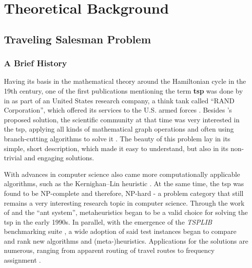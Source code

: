 
\chapter{Theoretical Background} %
\label{chap:background}
\glsresetall

\section{Traveling Salesman Problem}
\label{chap:tsp}

\subsection{A Brief History}

Having its basis in the mathematical theory around the Hamiltonian cycle in the 19th century, one of the first publications mentioning the term \textbf{\gls{tsp}} was done by  in \citeyear{robinson1949hamiltonian} as part of an United States research company, a think tank called \enquote{RAND Corporation}, which offered its services to the U.S. armed forces \cite{schrijver2005history}. Besides \citeauthor{robinson1949hamiltonian}'s proposed solution, the scientific community at that time was very interested in the \gls{tsp}, applying all kinds of mathematical graph operations and often using branch-cutting algorithms to solve it \cite{lawler1985traveling}. The beauty of this problem lay in its simple, short description, which made it easy to understand, but also in its non-trivial and engaging solutions.

With advances in computer science also came more computationally applicable algorithms, such as the Kernighan–Lin heuristic \cite{lin1973effective}. At the same time, the \gls{tsp} was found to be NP-complete and therefore, NP-hard \cite{papadimitriou1976some} - a problem category that still remains a very interesting research topic in computer science. Through the work of \citet{dorigo1991ant} and the \enquote{ant system}, metaheuristics began to be a valid choice for solving the \gls{tsp} in the early 1990s. In parallel, with the emergence of the \textit{TSPLIB} benchmarking suite \cite{reinelt1991tsplib}, a wide adoption of said test instances began to compare and rank new algorithms and (meta-)heuristics.
Applications for the solutions are numerous, ranging from apparent routing of travel routes to frequency assignment \cite{punnen2007traveling}.

